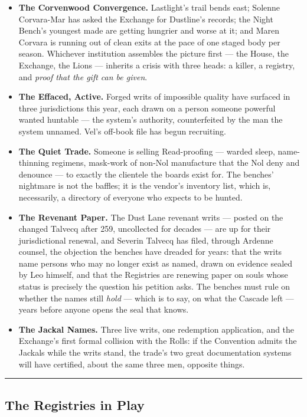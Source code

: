 \begin{itemize}
    \item \textbf{The Corvenwood Convergence.} Lastlight's trail bends east; Solenne Corvara-Mar has asked the Exchange for Dustline's records; the Night Bench's youngest made are getting hungrier and worse at it; and Maren Corvara is running out of clean exits at the pace of one staged body per season. Whichever institution assembles the picture first --- the House, the Exchange, the Lions --- inherits a crisis with three heads: a killer, a registry, and \textit{proof that the gift can be given}.
    \item \textbf{The Effaced, Active.} Forged writs of impossible quality have surfaced in three jurisdictions this year, each drawn on a person someone powerful wanted huntable --- the system's authority, counterfeited by the man the system unnamed. Vel's off-book file has begun recruiting.
    \item \textbf{The Quiet Trade.} Someone is selling Read-proofing --- warded sleep, name-thinning regimens, mask-work of non-Nol manufacture that the Nol deny and denounce --- to exactly the clientele the boards exist for. The benches' nightmare is not the baffles; it is the vendor's inventory list, which is, necessarily, a directory of everyone who expects to be hunted.
    \item \textbf{The Revenant Paper.} The Dust Lane revenant writs --- posted on the changed Talvecq after 259, uncollected for decades --- are up for their jurisdictional renewal, and Severin Talvecq has filed, through Ardenne counsel, the objection the benches have dreaded for years: that the writs name persons who may no longer exist as named, drawn on evidence sealed by Leo himself, and that the Registries are renewing paper on souls whose status is precisely the question his petition asks. The benches must rule on whether the names still \textit{hold} --- which is to say, on what the Cascade left --- years before anyone opens the seal that knows.
    \item \textbf{The Jackal Names.} Three live writs, one redemption application, and the Exchange's first formal collision with the Rolls: if the Convention admits the Jackals while the writs stand, the trade's two great documentation systems will have certified, about the same three men, opposite things.
\end{itemize}

\medskip\hrule\medskip

\subsection{The Registries in Play}

